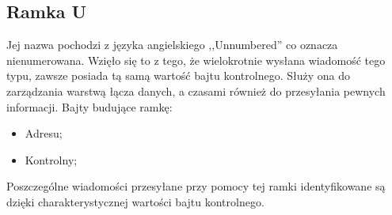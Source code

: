 \subsection{Ramka U}
Jej nazwa pochodzi z języka angielskiego ,,Unnumbered'' co oznacza nienumerowana.
Wzięło się to z tego, że wielokrotnie wysłana wiadomość tego typu, zawsze posiada tą samą wartość bajtu kontrolnego.
Służy ona do zarządzania warstwą łącza danych, a czasami również do przesyłania pewnych informacji.
\newline
Bajty budujące ramkę:
\begin{itemize}
	\item Adresu;
	\item Kontrolny;
\end{itemize}
Poszczególne wiadomości przesyłane przy pomocy tej ramki identyfikowane są dzięki charakterystycznej wartości bajtu kontrolnego.


